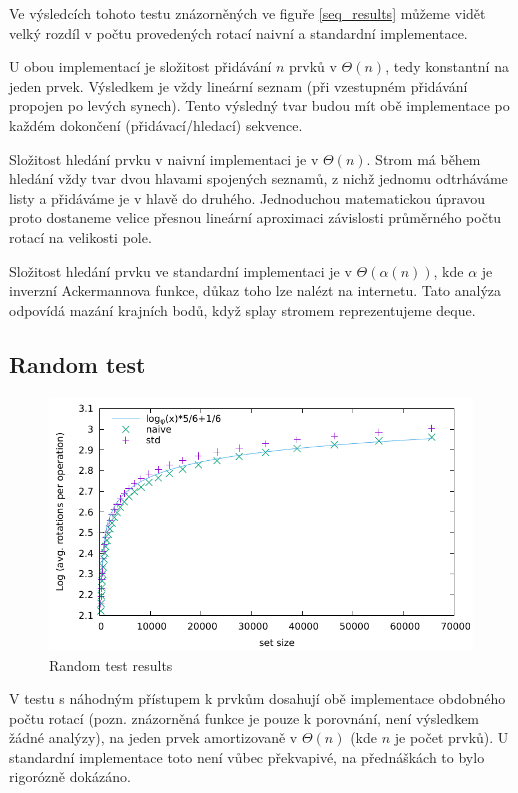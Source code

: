 \documentclass[a4paper,12pt]{article} %
\begin{document}
Ve výsledcích tohoto testu znázorněných ve figuře \ref{seq_results} můžeme vidět velký rozdíl v počtu provedených rotací naivní a standardní implementace.

U obou implementací je složitost přidávání $n$ prvků v $\Theta(n)$, tedy konstantní na jeden prvek. Výsledkem je vždy lineární seznam (při vzestupném přidávání propojen po levých synech). Tento výsledný tvar budou mít obě implementace po každém dokončení (přidávací/hledací) sekvence.

Složitost hledání prvku v naivní implementaci je v $\Theta(n)$. Strom má během hledání vždy tvar dvou hlavami spojených seznamů, z nichž jednomu odtrháváme listy a přidáváme je v hlavě do druhého. Jednoduchou matematickou úpravou proto dostaneme velice přesnou lineární aproximaci závislosti průměrného počtu rotací na velikosti pole.

Složitost hledání prvku ve standardní implementaci je v $\Theta(\alpha(n))$, kde $\alpha$ je inverzní Ackermannova funkce, důkaz toho lze nalézt na internetu. Tato analýza odpovídá mazání krajních bodů, když splay stromem reprezentujeme deque.

\pagebreak

\subsection*{Random test}

\begin{figure}[!htb]
    \caption{Random test results}
    \label{rng_results}
    \includegraphics{random.pdf}    
\end{figure}

V testu s náhodným přístupem k prvkům dosahují obě implementace obdobného počtu rotací (pozn. znázorněná funkce je pouze k porovnání, není výsledkem žádné analýzy), na jeden prvek amortizovaně v $\Theta(n)$ (kde $n$ je počet prvků). U standardní implementace toto není vůbec překvapivé, na přednáškách to bylo rigorózně dokázáno.
\end{document}
